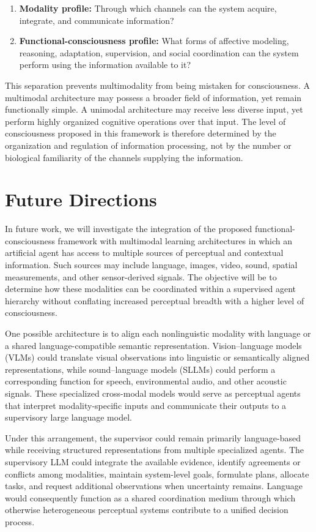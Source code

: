 \begin{enumerate}
\item \textbf{Modality profile:} Through which channels can the system acquire, integrate, and communicate information?
\item \textbf{Functional-consciousness profile:} What forms of affective modeling, reasoning, adaptation, supervision, and social coordination can the system perform using the information available to it?
\end{enumerate}

This separation prevents multimodality from being mistaken for consciousness. A multimodal architecture may possess a broader field of information, yet remain functionally simple. A unimodal architecture may receive less diverse input, yet perform highly organized cognitive operations over that input. The level of consciousness proposed in this framework is therefore determined by the organization and regulation of information processing, not by the number or biological familiarity of the channels supplying the information.

\section{Future Directions}
In future work, we will investigate the integration of the proposed functional-consciousness framework with multimodal learning architectures in which an artificial agent has access to multiple sources of perceptual and contextual information. Such sources may include language, images, video, sound, spatial measurements, and other sensor-derived signals. The objective will be to determine how these modalities can be coordinated within a supervised agent hierarchy without conflating increased perceptual breadth with a higher level of consciousness.

One possible architecture is to align each nonlinguistic modality with language or a shared language-compatible semantic representation. Vision–language models (VLMs) could translate visual observations into linguistic or semantically aligned representations, while sound–language models (SLLMs) could perform a corresponding function for speech, environmental audio, and other acoustic signals. These specialized cross-modal models would serve as perceptual agents that interpret modality-specific inputs and communicate their outputs to a supervisory large language model.

Under this arrangement, the supervisor could remain primarily language-based while receiving structured representations from multiple specialized agents. The supervisory LLM could integrate the available evidence, identify agreements or conflicts among modalities, maintain system-level goals, formulate plans, allocate tasks, and request additional observations when uncertainty remains. Language would consequently function as a shared coordination medium through which otherwise heterogeneous perceptual systems contribute to a unified decision process.

